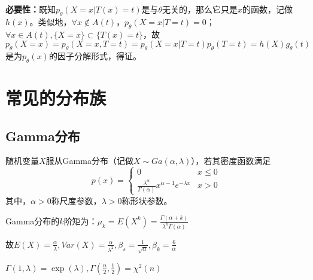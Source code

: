 \documentclass[UTF-8]{ctexbeamer}
\begin{document}
\begin{frame}
  \textbf{必要性：}既知$p_{\theta}(X=x|T(x)=t)$是与$\theta$无关的，那么它只是$x$的函数，记做$h(x)$。类似地，$\forall x\not\in A(t)$，$p_{\theta}(X=x|T=t)=0$；$\forall x\in A(t),\{X=x\}\subset \{T(x)=t\}$，故
  \[p_{\theta}(X=x)=p_{\theta}(X=x,T=t)=p_{\theta}(X=x|T=t)p_{\theta}(T=t)=h(X)g_{\theta}(t)\]
  是为$p_{\theta}(x)$的因子分解形式，得证。
\end{frame}





\section{常见的分布族}
\subsection{Gamma分布}

\begin{frame}
  \begin{Def}
    随机变量$X$服从Gamma分布（记做$X\sim Ga(\alpha,\lambda)$），若其密度函数满足
    \[p(x)=
      \begin{cases}
        0&x\leq 0\\
        \frac{\lambda^{\alpha}}{\Gamma(\alpha)}x^{\alpha-1}e^{-\lambda x}& x>0
      \end{cases}
    \]
    其中，$\alpha>0$称尺度参数，$\lambda>0$称形状参数。
  \end{Def}

  Gamma分布的$k$阶矩为：$\mu_{k}=E(X^{k})=\frac{\Gamma(\alpha+k)}{\lambda^{k}\Gamma(\alpha)}$ %

故$E(X)=\frac{\alpha}{\lambda},Var(X)=\frac{\alpha}{\lambda^{2}},\beta_{s}=\frac{1}{\sqrt{\alpha}},\beta_{k}=\frac{6}{\alpha}$

$\Gamma(1,\lambda)=\exp(\lambda),\Gamma(\frac{n}{2},\frac{1}{2})=\chi^{2}(n)$
\end{frame}
\end{document}
